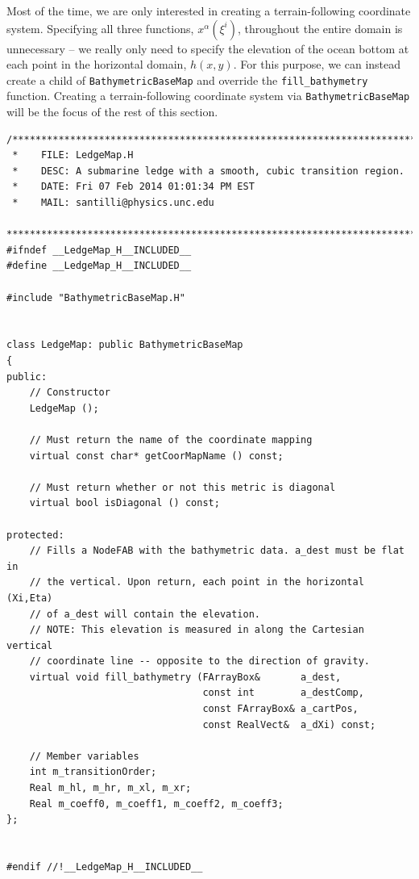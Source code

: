 \documentclass[12pt]{article}
\begin{document}
Most of the time, we are only interested in creating a terrain-following coordinate system. Specifying all three functions, $x^{\alpha}(\xi^i)$, throughout the entire domain is unnecessary -- we really only need to specify the elevation of the ocean bottom at each point in the horizontal domain, $h(x,y)$. For this purpose, we can instead create a child of \texttt{BathymetricBaseMap} and override the \texttt{fill\_bathymetry} function.
Creating a terrain-following coordinate system via \texttt{BathymetricBaseMap} will be the focus of the rest of this section.

\begin{lstlisting}[caption={The \texttt{LedgeMap} class header.},label=lstLedgeMapH]
/*************************************************************************
 *    FILE: LedgeMap.H
 *    DESC: A submarine ledge with a smooth, cubic transition region.
 *    DATE: Fri 07 Feb 2014 01:01:34 PM EST
 *    MAIL: santilli@physics.unc.edu
 ************************************************************************/
#ifndef __LedgeMap_H__INCLUDED__
#define __LedgeMap_H__INCLUDED__

#include "BathymetricBaseMap.H"


class LedgeMap: public BathymetricBaseMap
{
public:
    // Constructor
    LedgeMap ();

    // Must return the name of the coordinate mapping
    virtual const char* getCoorMapName () const;

    // Must return whether or not this metric is diagonal
    virtual bool isDiagonal () const;

protected:
    // Fills a NodeFAB with the bathymetric data. a_dest must be flat in
    // the vertical. Upon return, each point in the horizontal (Xi,Eta)
    // of a_dest will contain the elevation.
    // NOTE: This elevation is measured in along the Cartesian vertical
    // coordinate line -- opposite to the direction of gravity.
    virtual void fill_bathymetry (FArrayBox&       a_dest,
                                  const int        a_destComp,
                                  const FArrayBox& a_cartPos,
                                  const RealVect&  a_dXi) const;

	// Member variables
    int m_transitionOrder;
    Real m_hl, m_hr, m_xl, m_xr;
    Real m_coeff0, m_coeff1, m_coeff2, m_coeff3;
};


#endif //!__LedgeMap_H__INCLUDED__
\end{lstlisting}
\end{document}
